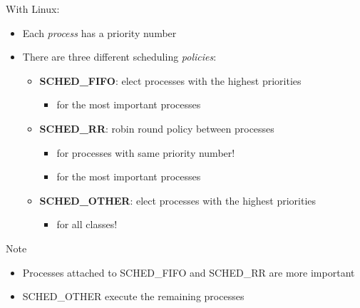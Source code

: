 \documentclass{beamer}[10pt, usepdftitle=false, handout]
\begin{document}
	\begin{frame}	
	
	With Linux:
	\vspace*{1em}
	\begin{itemize}
	\item{Each \textit{process} has a priority number}
	\item{There are three different scheduling \textit{policies}:
		\begin{itemize}
		\item{\textbf{SCHED\_FIFO}: elect processes with the highest priorities 
			\begin{itemize}
			\item{for the most important processes}
			\end{itemize}
		}
		\item{\textbf{SCHED\_RR}: robin round policy between processes 
			\begin{itemize}
			\item{for processes with same priority number!}
			\item{for the most important processes}
			\end{itemize}	
		}					
		\item{\textbf{SCHED\_OTHER}: elect processes with the highest priorities
			\begin{itemize}
			\item{for all classes!}
			\end{itemize}				
		}
		\end{itemize}			
	}
	\end{itemize}

	\begin{block}{Note}
	\begin{itemize}
	\item{Processes attached to SCHED\_FIFO and SCHED\_RR are more important}
	\item{SCHED\_OTHER execute the remaining processes}
	\end{itemize}
	\end{block}
	
	\end{frame}
	
\end{document}

